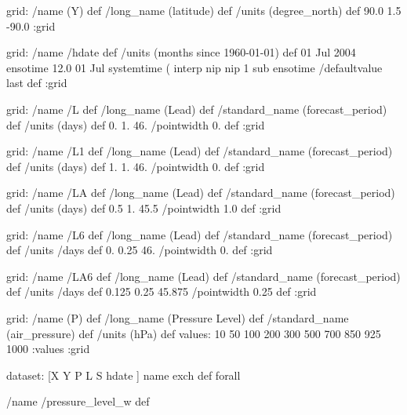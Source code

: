 \begin{ingrid}
{grid:
/name (Y) def
/long_name (latitude) def
/units (degree_north) def
90.0 1.5 -90.0
:grid

grid:
/name /hdate def
/units (months since 1960-01-01) def
01 Jul 2004 ensotime
12.0
01 Jul 
systemtime
   (%
    interp nip nip
    1 sub
ensotime
/defaultvalue { last } def
:grid

grid:
/name /L def
/long_name (Lead) def
/standard_name (forecast_period) def
/units (days) def
0. 1. 46.
/pointwidth 0. def
:grid

grid:
/name /L1 def
/long_name (Lead) def
/standard_name (forecast_period) def
/units (days) def
1. 1. 46.
/pointwidth 0. def
:grid

grid:
/name /LA def
/long_name (Lead) def
/standard_name (forecast_period) def
/units (days) def
0.5 1. 45.5
/pointwidth 1.0 def
:grid

 grid:
 /name /L6 def
 /long_name (Lead) def
 /standard_name (forecast_period) def
 /units /days def
 0. 0.25 46.
 /pointwidth 0. def
 :grid
 
 grid:
 /name /LA6 def
 /long_name (Lead) def
 /standard_name (forecast_period) def
 /units /days def
 0.125 0.25 45.875
 /pointwidth 0.25 def
 :grid

grid:
/name (P) def
/long_name (Pressure Level) def
/standard_name (air_pressure) def
/units (hPa) def
values: 10 50 100 200 300 500 700 850 925 1000 :values
:grid


dataset:
[X Y P L S hdate ] {name exch def } forall

/name /pressure_level_w def

}
\end{ingrid}
